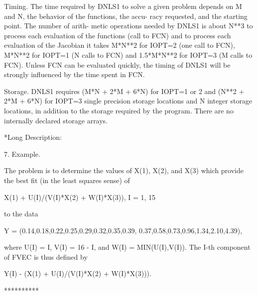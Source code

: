 \documentclass[11pt,twoside,nolof]{starlink}
\begin{document}
\begin{terminalv}
       Timing.  The time required by DNLS1 to solve a given problem
         depends on M and N, the behavior of the functions, the accu-
         racy requested, and the starting point.  The number of arith-
         metic operations needed by DNLS1 is about N**3 to process each
         evaluation of the functions (call to FCN) and to process each
         evaluation of the Jacobian it takes M*N**2 for IOPT=2 (one
         call to FCN), M*N**2 for IOPT=1 (N calls to FCN) and
         1.5*M*N**2 for IOPT=3 (M calls to FCN).  Unless FCN
         can be evaluated quickly, the timing of DNLS1 will be
         strongly influenced by the time spent in FCN.

       Storage.  DNLS1 requires (M*N + 2*M + 6*N) for IOPT=1 or 2 and
         (N**2 + 2*M + 6*N) for IOPT=3 single precision storage
         locations and N integer storage locations, in addition to
         the storage required by the program.  There are no internally
         declared storage arrays.

 *Long Description:

 7. Example.

       The problem is to determine the values of X(1), X(2), and X(3)
       which provide the best fit (in the least squares sense) of

             X(1) + U(I)/(V(I)*X(2) + W(I)*X(3)),  I = 1, 15

       to the data

             Y = (0.14,0.18,0.22,0.25,0.29,0.32,0.35,0.39,
                  0.37,0.58,0.73,0.96,1.34,2.10,4.39),

       where U(I) = I, V(I) = 16 - I, and W(I) = MIN(U(I),V(I)).  The
       I-th component of FVEC is thus defined by

             Y(I) - (X(1) + U(I)/(V(I)*X(2) + W(I)*X(3))).

       **********


\end{terminalv}
\end{document}
